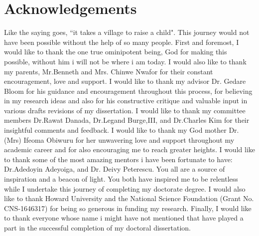 

\chapter*{Acknowledgements}

Like the saying goes, ``it takes a village to raise a child". This journey would not have been possible without the help of so many people. First and foremost, I would like to thank the one true ominipotent being, God for making this possible, without him i will not be where i am today. I would also like to thank my parents, Mr.Benneth and Mrs. Chinwe Nwafor for their constant encouragement, love and support. I would like to thank my advisor Dr. Gedare Bloom for his guidance and encouragement throughout this process, for believing in my research ideas and also for his constructive critique and valuable input in various drafts revisions of my dissertation. I would like to thank my committee members Dr.Rawat Danada, Dr.Legand Burge,III, and Dr.Charles Kim for their insightful comments and feedback. I would like to thank my God mother Dr.(Mrs) Ifeoma Obiwuru for her unwavering love and support throughout my academic career and for also encouraging me to reach greater heights. I would like to thank some of the most amazing mentors i have been fortunate to have: Dr.Adedoyin Adeyoiga, and Dr. Deivy Peterescu. You all are a source of inspiration and a beacon of light. You both have inspired me to be relentless while I undertake this journey of completing my doctorate degree. I would also like to thank Howard University and the National Science
Foundation (Grant No. CNS-1646317) for being so generous in funding my research. Finally, I would like to thank everyone whose name i might have not mentioned that have played a part in the successful completion of my doctoral dissertation. 



